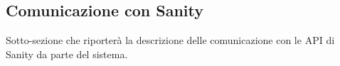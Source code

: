 \subsection{Comunicazione con Sanity}

Sotto-sezione che riporterà la descrizione delle comunicazione con le API di Sanity da parte del sistema.